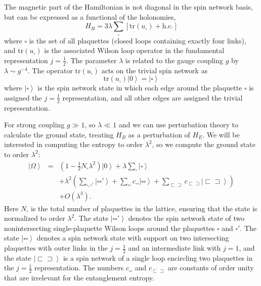 \documentclass[aps,prd,twocolumn,showpacs,groupedaddress,nofootinbib,letterpaper]{revtex4}
\newcommand{\ket}[1]{\left\vert#1\right\rangle}
\newcommand{\oneloop}{\square}
\newcommand{\twoloop}{\square\!\square}
\newcommand{\wideloop}{\sqsubset\!\sqsupset}
\begin{document}
The magnetic part of the Hamiltonian is not diagonal in the spin network basis, but can be expressed as a functional of the holonomies,
\begin{equation}
H_B = 
3 \lambda \sum_{\oneloop} \left[ \text{tr}(u_\oneloop) + \text{h.c.} \right]
\end{equation}
where $\square$ is the set of all plaquettes (closed loops containing exactly four links), and $\text{tr}(u_\square)$ is the associated Wilson loop operator in the fundamental representation $j = \tfrac{1}{2}$. 
The parameter $\lambda$ is related to the gauge coupling $g$ by $\lambda \sim g^{-4}$.
The operator $\text{tr}(u_\square)$ acts on the trivial spin network as
\begin{equation}
\text{tr}(u_\square) \ket{0} = \ket{\square}
\end{equation}
where $\ket{\square}$ is the spin network state in which each edge around the plaquette $\square$ is assigned the $j= \tfrac{1}{2}$ representation, and all other edges are assigned the trivial representation.


For strong coupling $g \gg 1$, so $\lambda \ll 1$ and we can use perturbation theory to calculate the ground state, treating $H_B$ as a perturbation of $H_E$. 
We will be interested in computing the entropy to order $\lambda^2$, so we compute the ground state to order $\lambda^2$:
\begin{eqnarray} \label{groundstate}
\ket{\Omega} &=& 
\left(1 - \tfrac{1}{2} N_\oneloop \lambda^2 \right) \ket{0} + \lambda \sum_{\oneloop} \ket{\oneloop} 
\nonumber \\
&& + \lambda^2 \left(
\sum_{\oneloop, \oneloop'} \ket{\oneloop \oneloop'} +
\sum_{\twoloop} c_{\twoloop} \ket{\twoloop} + \sum_{\wideloop} c_{\wideloop} \ket{\wideloop} \right) \nonumber \\
&& + O(\lambda^3).
\end{eqnarray}
Here $N_\oneloop$ is the total number of plaquettes in the lattice, ensuring that the state is normalized to order $\lambda^2$.
The state $\ket{\oneloop \oneloop'}$ denotes the spin network state of two nonintersecting single-plaquette Wilson loops around the plaquettes $\oneloop$ and $\oneloop'$.
The state $\ket{\twoloop}$ denotes a spin network state with support on two intersecting plaquettes with outer links in the $j=\tfrac{1}{2}$ and an intermediate link with $j=1$, and the state $\ket{\wideloop}$ is a spin network of a single loop encircling two plaquettes in the $j=\tfrac{1}{2}$ representation.
The numbers $c_{\twoloop}$ and $c_{\wideloop}$ are constants of order unity that are irrelevant for the entanglement entropy.
\end{document}
